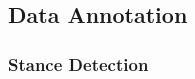 \documentclass[letterpaper]{article}
\begin{document}
\subsection{Data Annotation}\label{data_annotate}
\subsubsection{Stance Detection}

\end{document}
